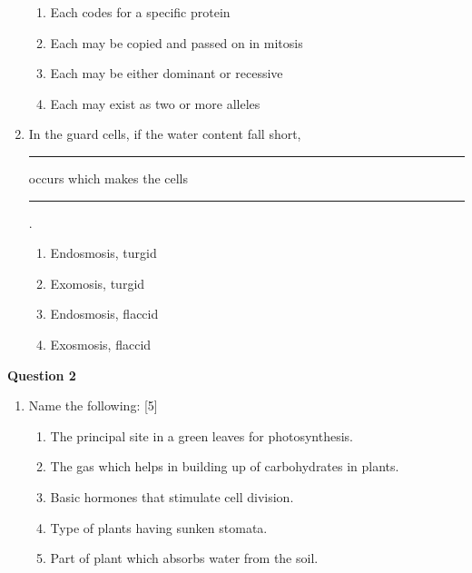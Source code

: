 \begin{enumerate}[label=(\roman*)]
        \begin{enumerate}[label=(\alph*)]
            \setlength\itemsep{0em}
            \item Each codes for a specific protein
            \item Each may be copied and passed on in mitosis
            \item Each may be either dominant or recessive
            \item Each may exist as two or more alleles
        \end{enumerate}

    \item In the guard cells, if the water content fall short, \rule{2cm}{0.15mm} occurs 
        which makes the cells \rule{2cm}{0.15mm}.

        \begin{enumerate}[label=(\alph*)]
            \setlength\itemsep{0em}
            \item Endosmosis, turgid 
            \item Exomosis, turgid 
            \item Endosmosis, flaccid 
            \item Exosmosis, flaccid 
        \end{enumerate}

\end{enumerate}

\par
\noindent
\textbf{Question 2}\\
\begin{enumerate}[label=(\roman*)]

    \item Name the following: \hfill [5]
        \begin{enumerate}[label=(\alph*)]
            \setlength\itemsep{0em}
            \item The principal site in a green leaves for photosynthesis.
            \item The gas which helps in building up of carbohydrates in plants.
            \item Basic hormones that stimulate cell division.
            \item Type of plants having sunken stomata.
            \item Part of plant which absorbs water from the soil.
        \end{enumerate}

\end{enumerate}


